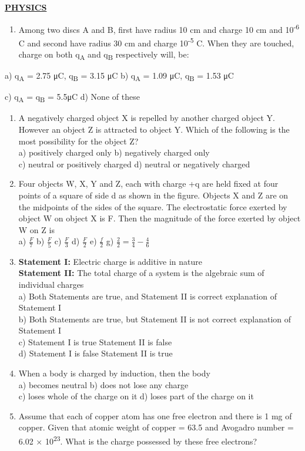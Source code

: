 \textbf{\ul{PHYSICS}}

\begin{enumerate}
\def\labelenumi{\arabic{enumi}.}
\item
  Among two discs A and B, first have radius 10 cm and charge 10 cm and
  10\textsuperscript{-6} C and second have radius 30 cm and charge
  10\textsuperscript{-5} C. When they are touched, charge on both
  q\textsubscript{A} and q\textsubscript{B} respectively will, be:
\end{enumerate}

a) q\textsubscript{A} = 2.75 μC, q\textsubscript{B} = 3.15 μC b)
q\textsubscript{A} = 1.09 μC, q\textsubscript{B} = 1.53 μC

c) q\textsubscript{A} = q\textsubscript{B} = 5.5μC d) None of these

\begin{enumerate}
\def\labelenumi{\arabic{enumi}.}
\setcounter{enumi}{1}
\item
  A negatively charged object X is repelled by another charged object Y.
  However an object Z is attracted to object Y. Which of the following
  is the most possibility for the object Z?\\
  a) positively charged only b) negatively charged only\\
  c) neutral or positively charged d) neutral or negatively charged
\item
  Four objects W, X, Y and Z, each with charge +q are held fixed at four
  points of a square of side d as shown in the figure. Objects X and Z
  are on the midpoints of the sides of the square. The electrostatic
  force exerted by object W on object X is F. Then the magnitude of the
  force exerted by object W on Z is\\
  a) \(\frac{F}{7}\) b) \(\frac{F}{5}\) c) \(\frac{F}{3}\) d)
  \(\frac{F}{2}\) e) \(\frac{f}{2}\) g)
  \(\frac{2}{2} = \frac{3}{4} - \frac{4}{6}\)
\item
  \textbf{Statement I:} Electric charge is additive in nature\\
  \textbf{Statement II:} The total charge of a system is the algebraic
  sum of individual charges\\
  a) Both Statements are true, and Statement II is correct explanation
  of Statement I\\
  b) Both Statements are true, but Statement II is not correct
  explanation of Statement I\\
  c) Statement I is true Statement II is false\\
  d) Statement I is false Statement II is true
\item
  When a body is charged by induction, then the body\\
  a) becomes neutral b) does not lose any charge\\
  c) loses whole of the charge on it d) loses part of the charge on it
\item
  Assume that each of copper atom has one free electron and there is 1
  mg of copper. Given that atomic weight of copper = 63.5 and Avogadro
  number = 6.02 × 10\textsuperscript{23}. What is the charge possessed
  by these free electrons?
\end{enumerate}

